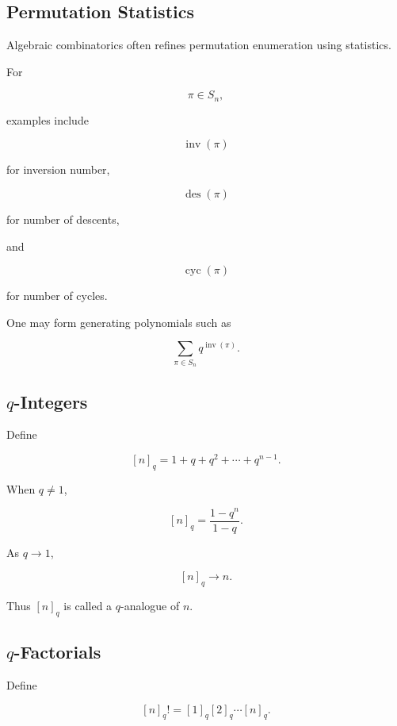 \subsection{Permutation Statistics}
\label{subsec:algebraic-permutation-statistics}

Algebraic combinatorics often refines permutation enumeration using
statistics.

For

\[
\pi\in S_n,
\]

examples include

\[
\operatorname{inv}(\pi)
\]

for inversion number,

\[
\operatorname{des}(\pi)
\]

for number of descents,

and

\[
\operatorname{cyc}(\pi)
\]

for number of cycles.

One may form generating polynomials such as

\[
\boxed{
\sum_{\pi\in S_n}
q^{\operatorname{inv}(\pi)}.
}
\]

\subsection{\(q\)-Integers}
\label{subsec:q-integers-algebraic}

Define

\[
\boxed{
[n]_q
=
1+q+q^2+\cdots+q^{n-1}.
}
\]

When \(q\neq1\),

\[
\boxed{
[n]_q
=
\frac{1-q^n}{1-q}.
}
\]

As \(q\to1\),

\[
[n]_q\to n.
\]

Thus \([n]_q\) is called a \(q\)-analogue of \(n\).

\subsection{\(q\)-Factorials}
\label{subsec:q-factorials-algebraic}

Define

\[
\boxed{
[n]_q!
=
[1]_q[2]_q\cdots[n]_q.
}
\]

